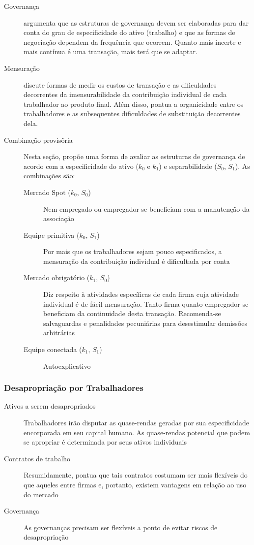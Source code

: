 \begin{description}
	\item[Governança] \autor argumenta que as estruturas de governança devem ser elaboradas para dar conta do grau de especificidade do ativo (trabalho) e que as formas de negociação dependem da frequência que ocorrem. Quanto mais incerte e mais contínua é uma transação, mais terá que se adaptar.
	\item[Mensuração] \autor discute formas de medir os custos de transação e as dificuldades decorrentes da imensurabilidade da contribuição individual de cada trabalhador ao produto final. Além disso, pontua a organicidade entre os trabalhadores e as subsequentes dificuldades de substituição decorrentes dela.
	\item[Combinação provisõria] Nesta seção, \autor propõe uma forma de avaliar as estruturas de governança de acordo com a especificidade do ativo ($k_0$ e $k_1$) e separabilidade ($S_0$, $S_1$). As combinações são:
	\begin{description}
		\item[Mercado Spot ($k_0$, $S_0$)] Nem empregado ou empregador se beneficiam com a manutenção da associação
		\item[Equipe primitiva ($k_0$, $S_1$)] Por mais que os trabalhadores sejam pouco especificados, a mensuração da contribuição individual é dificultada por conta 
		\item[Mercado obrigatório ($k_1$, $S_0$)] Diz respeito à atividades específicas de cada firma cuja atividade individual é de fácil mensuração. Tanto firma quanto empregador se beneficiam da continuidade desta transação. Recomenda-se salvaguardas e penalidades pecuniárias para desestimular demissões arbitrárias
		\item[Equipe conectada ($k_1$, $S_1$)] Autoexplicativo
	\end{description}
\end{description}

\subsubsection*{Desapropriação por Trabalhadores}

\begin{description}
	\item[Ativos a serem desapropriados] Trabalhadores irão disputar as quase-rendas geradas por sua especificidade encorporada em seu capital humano. As quase-rendas potencial que podem se apropriar é determinada por seus ativos individuais
	\item[Contratos de trabalho] Resumidamente, pontua que tais contratos costumam ser mais flexíveis do que aqueles entre firmas e, portanto, existem vantagens em relação ao uso do mercado
	\item[Governança] As governanças precisam ser flexíveis a ponto de evitar riscos de desapropriação
\end{description}

